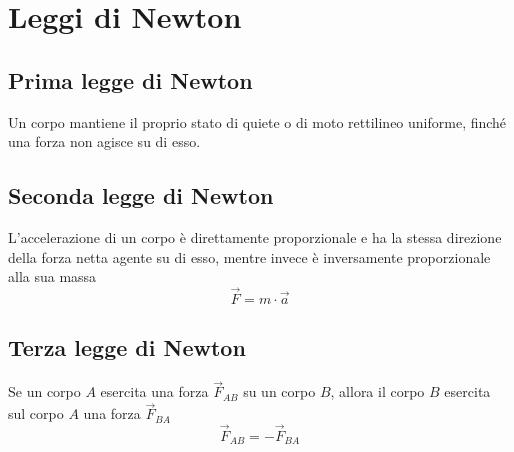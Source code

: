 \section{Leggi di Newton}
\subsection{Prima legge di Newton}
Un corpo mantiene il proprio stato di quiete o di moto rettilineo uniforme, finché una forza non agisce su di esso.
\subsection{Seconda legge di Newton}
L'accelerazione di un corpo è direttamente proporzionale e ha la stessa direzione della forza netta agente su di esso, mentre invece è inversamente proporzionale alla sua massa
	\begin{displaymath}
		\vec{F} = m \cdot \vec{a}
	\end{displaymath}

\subsection{Terza legge di Newton}
Se un corpo $A$ esercita una forza $\vec{F}_{AB}$ su un corpo $B$, allora il corpo $B$ esercita sul corpo $A$ una forza $\vec{F}_{BA}$
	\begin{displaymath}
    	\vec{F}_{AB} = -\vec{F}_{BA}
    \end{displaymath}
	

